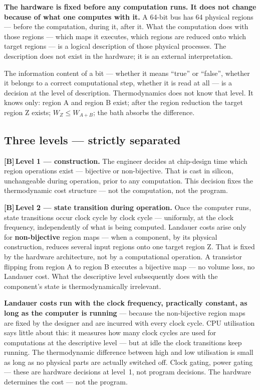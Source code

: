 \documentclass[11pt,a4paper]{article}
\newcommand{\LB}{\textcolor{layB}{\textbf{\footnotesize\textsf{[B]}}}\,}
\begin{document}
\textbf{The hardware is fixed before any computation runs. It does not change
because of what one computes with it.} A 64-bit bus has 64 physical regions ---
before the computation, during it, after it. What the computation does with those
regions --- which maps it executes, which regions are reduced onto which target
regions --- is a logical description of those physical processes. The description
does not exist in the hardware; it is an external interpretation.

The information content of a bit --- whether it means “true” or “false”, whether
it belongs to a correct computational step, whether it is read at all --- is a
decision at the level of description. Thermodynamics does not know that level. It
knows only: region A and region B exist; after the region reduction the target
region Z exists; $W_Z \le W_{A+B}$; the bath absorbs the difference.

\subsection{Three levels --- strictly separated}

\LB \textbf{Level 1 --- construction.} The engineer decides at chip-design time
which region operations exist --- bijective or non-bijective. That is cast in
silicon, unchangeable during operation, prior to any computation. This decision
fixes the thermodynamic cost structure --- not the computation, not the program.

\LB \textbf{Level 2 --- state transition during operation.} Once the computer
runs, state transitions occur clock cycle by clock cycle --- uniformly, at the
clock frequency, independently of what is being computed. Landauer costs arise
only for \textbf{non-bijective} region maps --- when a component, by its physical
construction, reduces several input regions onto one target region Z. That is
fixed by the hardware architecture, not by a computational operation. A transistor
flipping from region A to region B executes a bijective map --- no volume loss, no
Landauer cost. What the descriptive level subsequently does with the component's
state is thermodynamically irrelevant.

\textbf{Landauer costs run with the clock frequency, practically constant, as long
as the computer is running} --- because the non-bijective region maps are fixed by
the designer and are incurred with every clock cycle. CPU utilisation says little
about this: it measures how many clock cycles are used for computations at the
descriptive level --- but at idle the clock transitions keep running. The
thermodynamic difference between high and low utilisation is small as long as no
physical parts are actually switched off. Clock gating, power gating --- these are
hardware decisions at level~1, not program decisions. The hardware determines the
cost --- not the program.
\end{document}
